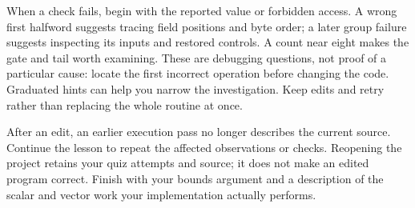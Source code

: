 When a check fails, begin with the reported value or forbidden access. A wrong
first halfword suggests tracing field positions and byte order; a later group
failure suggests inspecting its inputs and restored controls. A count near eight
makes the gate and tail worth examining. These are debugging questions, not
proof of a particular cause: locate the first incorrect operation before changing
the code. Graduated hints can help you narrow the investigation. Keep edits and
retry rather than replacing the whole routine at once.

After an edit, an earlier execution pass no longer describes the current source.
Continue the lesson to repeat the affected observations or checks. Reopening the
project retains your quiz attempts and source; it does not make an edited program
correct. Finish with your bounds argument and a description of the scalar and
vector work your implementation actually performs.

